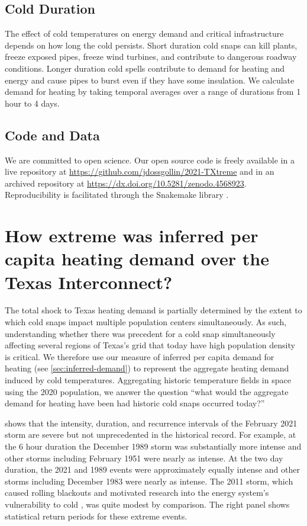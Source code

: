 \documentclass[12pt]{iopart}
\begin{document}
\subsection{Cold Duration}

The effect of cold temperatures on energy demand and critical infrastructure depends on how long the cold persists.
Short duration cold snaps can kill plants, freeze exposed pipes, freeze wind turbines, and contribute to dangerous roadway conditions.
Longer duration cold spells contribute to demand for heating and energy and cause pipes to burst even if they have some insulation.
We calculate demand for heating by taking temporal averages over a range of durations from 1 hour to 4 days.

\subsection{Code and Data}

We are committed to open science.
Our open source code is freely available in a live repository at \url{https://github.com/jdossgollin/2021-TXtreme} and in an archived repository at \url{https://dx.doi.org/10.5281/zenodo.4568923}.
Reproducibility is facilitated through the Snakemake library \cite{koster_snakemake:2012}.

\section{How extreme was inferred per capita heating demand over the Texas Interconnect?}

The total shock to Texas heating demand is partially determined by the extent to which cold snaps impact multiple population centers simultaneously.
As such, understanding whether there was precedent for a cold snap simultaneously affecting several regions of Texas's grid that today have high population density is critical.
We therefore use our measure of inferred per capita demand for heating (see \cref{sec:inferred-demand}) to represent the aggregate heating demand induced by cold temperatures.
Aggregating historic temperature fields in space using the 2020 population, we answer the question ``what would the aggregate demand for heating have been had historic cold snaps occurred today?''

 shows that the intensity, duration, and recurrence intervals of the February 2021 storm are severe but not unprecedented in the historical record.
For example, at the 6 hour duration the December 1989 storm was substantially more intense and other storms including February 1951 were nearly as intense.
At the two day duration, the 2021 and 1989 events were approximately equally intense and other storms including December 1983 were nearly as intense.
The 2011 storm, which caused rolling blackouts and motivated research into the energy system's vulnerability to cold \cite{ferc_outages:2011}, was quite modest by comparison.
The right panel shows statistical return periods for these extreme events.
\end{document}
